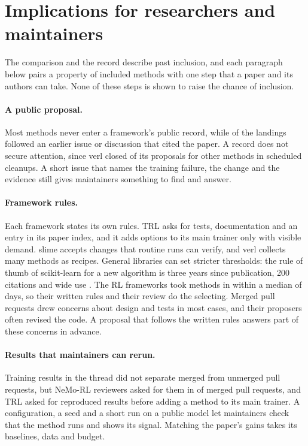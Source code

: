 \documentclass{article}
\begin{document}
\section{Implications for researchers and maintainers}
\label{sec:advice}

The comparison and the record describe past inclusion, and each paragraph below pairs a property of included methods with one step that a paper and its authors can take. None of these steps is shown to raise the chance of inclusion.

\paragraph{A public proposal.} Most methods never enter a framework's public record, while \NLandingPriorRequest{} of the \NLandingEvents{} landings followed an earlier issue or discussion that cited the paper. A record does not secure attention, since verl closed \PrverlAttStale{} of its \PrverlAtt{} proposals for other methods in scheduled cleanups. A short issue that names the training failure, the change and the evidence still gives maintainers something to find and answer.

\paragraph{Framework rules.} Each framework states its own rules. TRL asks for tests, documentation and an entry in its paper index, and it adds options to its main trainer only with visible demand. slime accepts changes that routine runs can verify, and verl collects many methods as recipes. General libraries can set stricter thresholds: the rule of thumb of scikit-learn for a new algorithm is three years since publication, 200 citations and wide use \citep{sklearnfaq}. The RL frameworks took methods in within a median of \LagMedian{} days, so their written rules and their review do the selecting. Merged pull requests drew concerns about design and tests in most cases, and their proposers often revised the code. A proposal that follows the written rules answers part of these concerns in advance.

\paragraph{Results that maintainers can rerun.} Training results in the thread did not separate merged from unmerged pull requests, but NeMo-RL reviewers asked for them in \RevNeMoMReq{} of \RevNeMoMN{} merged pull requests, and TRL asked for reproduced results before adding a method to its main trainer. A configuration, a seed and a short run on a public model let maintainers check that the method runs and shows its signal. Matching the paper's gains takes its baselines, data and budget.
\end{document}
